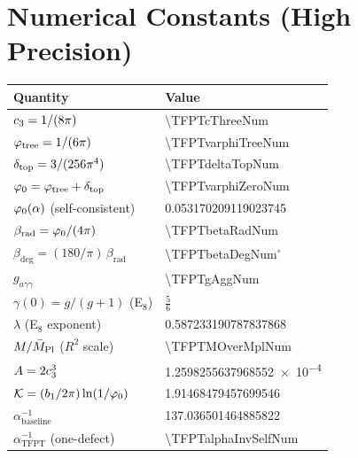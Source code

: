 \appendix
\section{Numerical Constants (High Precision)}

\begin{table}[H]
\centering
\small
\begin{tabular}{@{}ll@{}}
\toprule
\textbf{Quantity} & \textbf{Value}\\
\midrule
$c_3 = 1/(8\pi)$ & \num[round-mode=places,round-precision=12]{\TFPTcThreeNum}\\
$\varphi_{\mathrm{tree}} = 1/(6\pi)$ & \num[round-mode=places,round-precision=12]{\TFPTvarphiTreeNum}\\
$\delta_{\mathrm{top}} = 3/(256\pi^4)$ & \num[round-mode=places,round-precision=12]{\TFPTdeltaTopNum}\\
$\varphi_0 = \varphi_{\mathrm{tree}} + \delta_{\mathrm{top}}$ & \num[round-mode=places,round-precision=12]{\TFPTvarphiZeroNum}\\
$\varphi_0(\alpha)$ (self-consistent) & \num[round-mode=places,round-precision=12]{0.053170209119023745}\\
$\beta_{\text{rad}} = \varphi_0/(4\pi)$ & \num[round-mode=places,round-precision=12]{\TFPTbetaRadNum}\\
$\beta_{\text{deg}} = (180/\pi)\,\beta_{\text{rad}}$ & \num[round-mode=places,round-precision=6]{\TFPTbetaDegNum}$^\circ$\\
$g_{a\gamma\gamma}$ & \num[round-mode=places,round-precision=12]{\TFPTgAggNum}\\
$\gamma(0)=g/(g+1)$ (E$_8$) & $\tfrac56$\\
$\lambda$ (E$_8$ exponent) & \num[round-mode=places,round-precision=12]{0.587233190787837868}\\
$M/\bar{M}_{\mathrm{Pl}}$ ($R^2$ scale) & \num[round-mode=places,round-precision=12]{\TFPTMOverMplNum}\\
$A = 2c_3^3$ & \num[round-mode=figures,round-precision=8]{1.2598255637968552e-4}\\
$\mathcal{K} = (b_1/2\pi)\ln(1/\varphi_0)$ & \num[round-mode=places,round-precision=10]{1.91468479457699546}\\
$\alpha^{-1}_{\text{baseline}}$ & \num[round-mode=places,round-precision=9]{137.036501464885822}\\
$\alpha^{-1}_{\text{TFPT}}$ (one-defect) & \num[round-mode=places,round-precision=12]{\TFPTalphaInvSelfNum}\\

\end{tabular}
\end{table}
